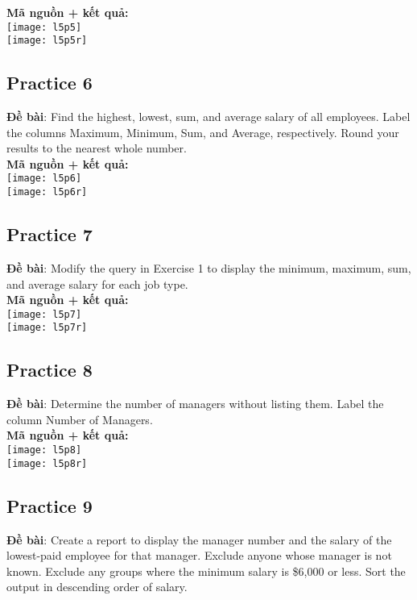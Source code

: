 \documentclass[a4paper]{report}
\begin{document}
\textbf{Mã nguồn + kết quả: }\\
\texttt{[image: l5p5]}\\
\texttt{[image: l5p5r]}

\subsection{Practice 6}
\noindent
\textbf{Đề bài}: Find the highest, lowest, sum, and average salary of all employees. Label the columns Maximum, Minimum, Sum, and Average, respectively. Round your results to the nearest whole number.\\

\textbf{Mã nguồn + kết quả: }\\
\texttt{[image: l5p6]}\\
\texttt{[image: l5p6r]}

\subsection{Practice 7}
\noindent
\textbf{Đề bài}: Modify the query in Exercise 1 to display the minimum, maximum, sum, and average salary for each job type.\\

\textbf{Mã nguồn + kết quả: }\\
\texttt{[image: l5p7]}\\
\texttt{[image: l5p7r]}

\subsection{Practice 8}
\noindent
\textbf{Đề bài}: Determine the number of managers without listing them. Label the column Number of Managers.\\

\textbf{Mã nguồn + kết quả: }\\
\texttt{[image: l5p8]}\\
\texttt{[image: l5p8r]}

\subsection{Practice 9}
\noindent
\textbf{Đề bài}: Create a report to display the manager number and the salary of the lowest-paid employee for that manager. Exclude anyone whose manager is not known. Exclude any groups where the minimum salary is \$6,000 or less. Sort the output in descending order of salary.\\
\end{document}
